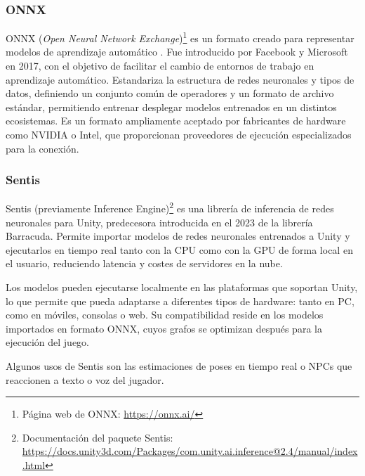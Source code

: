 \subsubsection{ONNX}
ONNX (\textit{Open Neural Network Exchange})\footnote{Página web de ONNX: \url{https://onnx.ai/}} es un formato creado para representar modelos de aprendizaje automático . Fue introducido por Facebook y Microsoft en 2017, con el objetivo de facilitar el cambio de entornos de trabajo en aprendizaje automático. Estandariza la estructura de redes neuronales y tipos de datos, definiendo un conjunto común de operadores y un formato de archivo estándar, permitiendo entrenar desplegar modelos entrenados en un distintos ecosistemas. Es un formato ampliamente aceptado por fabricantes de hardware como NVIDIA o Intel, que proporcionan proveedores de ejecución especializados para la conexión.

\subsubsection{Sentis}
Sentis (previamente Inference Engine)\footnote{Documentación del paquete Sentis: \url{https://docs.unity3d.com/Packages/com.unity.ai.inference@2.4/manual/index.html}} es una librería de inferencia de redes neuronales para Unity, predecesora introducida en el 2023 de la librería Barracuda. Permite importar modelos de redes neuronales entrenados a Unity y ejecutarlos en tiempo real tanto con la CPU como con la GPU  de forma local en el usuario, reduciendo latencia y costes de servidores en la nube. \newline

Los modelos pueden ejecutarse localmente en las plataformas que soportan Unity, lo que permite que pueda adaptarse a diferentes tipos de hardware: tanto en PC, como en móviles, consolas o web. Su compatibilidad reside en los modelos importados en formato ONNX, cuyos grafos se optimizan después para la ejecución del juego. \newline

Algunos usos de Sentis son las estimaciones de poses en tiempo real o NPCs que reaccionen a texto o voz del jugador.